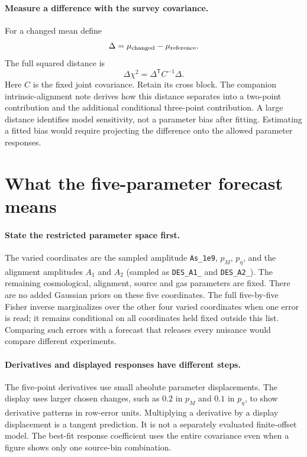 \documentclass[11pt]{article}
\newcommand{\T}{^{\mathsf T}}
\newcommand{\us}{\_\allowbreak}
\begin{document}
\paragraph{Measure a difference with the survey covariance.}
For a changed mean define
\begin{equation}
 \Delta=\mu_{\rm changed}-\mu_{\rm reference}.
\end{equation}
The full squared distance is
\begin{equation}
 \Delta\chi^2=\Delta\T C^{-1}\Delta.
\end{equation}
Here $C$ is the fixed joint covariance. Retain its cross block. The
companion intrinsic-alignment note derives how this distance separates
into a two-point contribution and the additional conditional three-point
contribution. A large distance identifies model sensitivity, not a
parameter bias after fitting. Estimating a fitted bias would require
projecting the difference onto the allowed parameter responses.

\section{What the five-parameter forecast means}
\paragraph{State the restricted parameter space first.}
The varied coordinates are the sampled amplitude \texttt{As\us 1e9},
$p_M$, $p_\eta$, and the alignment amplitudes $A_1$ and $A_2$ (sampled
as \texttt{DES\us A1\us 1} and \texttt{DES\us A2\us 1}). The remaining cosmological, alignment, source and gas parameters
are fixed. There are no added Gaussian priors on these five coordinates.
The full five-by-five Fisher inverse marginalizes over the other four
varied coordinates when one error is read; it remains conditional on all
coordinates held fixed outside this list. Comparing such errors with a
forecast that releases every nuisance would compare different experiments.

\paragraph{Derivatives and displayed responses have different steps.}
The five-point derivatives use small absolute parameter displacements.
The display uses larger chosen changes, such as $0.2$ in $p_M$ and $0.1$
in $p_\eta$, to show derivative patterns in row-error units. Multiplying
a derivative by a display displacement is a tangent prediction. It is
not a separately evaluated finite-offset model. The best-fit response
coefficient uses the entire covariance even when a figure shows only one
source-bin combination.
\end{document}
